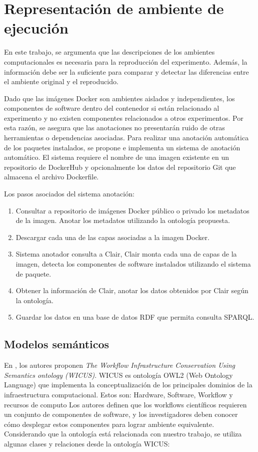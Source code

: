 \chapter{Representación de ambiente de ejecución}

En este trabajo, se argumenta que las descripciones de los ambientes computacionales es necesaria para la reproducción  del experimento. Además, la información debe ser la suficiente para comparar y detectar las diferencias entre el ambiente original y el reproducido.

Dado que las imágenes Docker son ambientes aislados y independientes, los componentes de software dentro del contenedor si están relacionado al experimento y no existen componentes relacionados a otros experimentos.
Por esta razón, se asegura que las anotaciones no presentarán ruido de otras herramientas o dependencias asociadas.
Para realizar una anotación automática de los paquetes instalados, se propone e implementa un sistema de anotación automático. El sistema requiere el nombre de una imagen existente en un repositorio de DockerHub y opcionalmente los datos del repositorio Git que almacena el archivo Dockerfile. 

Los pasos asociados del sistema anotación:

\begin{enumerate}
	\item Consultar a repositorio de imágenes Docker público o privado los metadatos de la imagen. Anotar los metadatos utilizando la ontología propuesta.
	\item Descargar cada una de las capas asociadas a la imagen Docker.
	\item Sistema anotador consulta a Clair, Clair monta cada una de capas de la imagen, detecta los componentes de software instalados utilizando el sistema de paquete.
	\item Obtener la información de Clair, anotar los datos obtenidos por Clair según la ontología.
	\item Guardar los datos en una base de datos RDF que permita consulta SPARQL.
\end{enumerate} 

\section{Modelos semánticos}\label{s4.1}
     
En \cite{santana2017reproducibility}, los autores proponen \emph{The Workflow Infrastructure Conservation Using Semantics ontology (WICUS)}. WICUS es ontología OWL2 (Web Ontology Language) que implementa la conceptualización de los principales dominios de la infraestructura computacional. Estos son: Hardware, Software, Workflow y recursos de computo
Los autores definen que los workflows científicos requieren un conjunto de componentes de software, y los investigadores deben conocer cómo desplegar estos componentes para lograr ambiente equivalente.
Considerando que la ontología está relacionada con nuestro trabajo, se utiliza algunas clases y relaciones desde la ontología WICUS:

